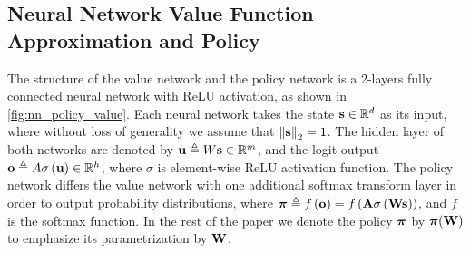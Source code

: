 

\subsection{Neural Network Value Function Approximation and Policy}
\label{subsec:nn_value_policy}
The structure of the value network and the policy network  is a 2-layers fully connected neural network with ReLU activation, as shown in \cref{fig:nn_policy_value}. 
Each neural network takes the state ${\mathbf{s}} \in {\mathbb{R}}^d$ as its input, where without loss of generality we assume that $\left\| {\mathbf{s}} \right\|_2 = 1$.
The hidden layer of both networks are denoted by ${\mathbf{u}}   \triangleq W{\mathbf{s}}\in{\mathbb{R}}^m$, and the logit output ${\mathbf{o}} \triangleq A\sigma\left( {\mathbf{u}}\right) \in {\mathbb{R}}^h$, where $\sigma$ is element-wise ReLU activation function. 
The policy network differs the value network with one additional softmax transform layer in order to output probability distributions, where ${\boldsymbol{\pi}} \triangleq f\left( {\mathbf{o}} \right) = f\left( {\mathbf{A}} \sigma\left( {\mathbf{W}} {\mathbf{s}} \right) \right)$, and $f$ is the softmax function. In the rest of the paper we denote the policy ${\boldsymbol{\pi}}$ by ${\boldsymbol{\pi}}({\mathbf{W}})$ to emphasize its parametrization by ${\mathbf{W}}$. 


